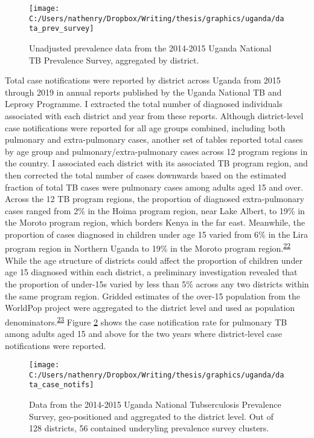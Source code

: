 \documentclass[
]{article}
\begin{document}
\begin{figure}[!ht]

{\centering \texttt{[image: C:/Users/nathenry/Dropbox/Writing/thesis/graphics/uganda/data\_prev\_survey]} 

}

\caption{Unadjusted prevalence data from the 2014-2015 Uganda National TB Prevalence Survey, aggregated by district.}\label{fig:data-prev-survey}
\end{figure}

Total case notifications were reported by district across Uganda from 2015 through 2019 in annual reports published by the Uganda National TB and Leprosy Programme. I extracted the total number of diagnosed individuals associated with each district and year from these reports. Although district-level case notifications were reported for all age groups combined, including both pulmonary and extra-pulmonary cases, another set of tables reported total cases by age group and pulmonary/extra-pulmonary cases across 12 program regions in the country. I associated each district with its associated TB program region, and then corrected the total number of cases downwards based on the estimated fraction of total TB cases were pulmonary cases among adults aged 15 and over. Across the 12 TB program regions, the proportion of diagnosed extra-pulmonary cases ranged from 2\% in the Hoima program region, near Lake Albert, to 19\% in the Moroto program region, which borders Kenya in the far east. Meanwhile, the proportion of cases diagnosed in children under age 15 varied from 6\% in the Lira program region in Northern Uganda to 19\% in the Moroto program region.\textsuperscript{\protect\hyperlink{ref-UgandaNationalTuberculosisandLeprosyProgramme2018}{22}} While the age structure of districts could affect the proportion of children under age 15 diagnosed within each district, a preliminary investigation revealed that the proportion of under-15s varied by less than 5\% across any two districts within the same program region. Gridded estimates of the over-15 population from the WorldPop project were aggregated to the district level and used as population denominators.\textsuperscript{\protect\hyperlink{ref-Tatem2017}{23}} Figure \ref{fig:data-case-notifs} shows the case notification rate for pulmonary TB among adults aged 15 and above for the two years where district-level case notifications were reported.

\begin{figure}[!ht]

{\centering \texttt{[image: C:/Users/nathenry/Dropbox/Writing/thesis/graphics/uganda/data\_case\_notifs]} 

}

\caption{Data from the 2014-2015 Uganda National Tubserculosis Prevalence Survey, geo-positioned and aggregated to the district level. Out of 128 districts, 56 contained underyling prevalence survey clusters.}\label{fig:data-case-notifs}
\end{figure}
\end{document}
